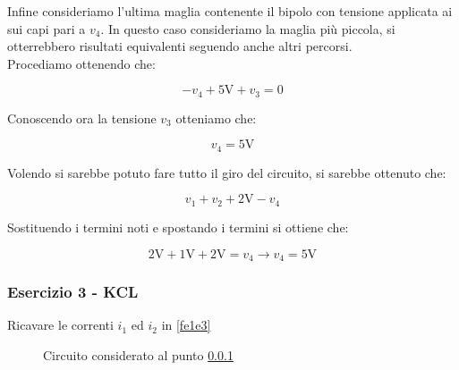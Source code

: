 \documentclass[../main.tex]{subfiles}
\begin{document}
Infine consideriamo l'ultima maglia contenente il bipolo con tensione applicata ai sui capi pari a $v_4$. In questo caso consideriamo la maglia più piccola, si otterrebbero risultati equivalenti seguendo anche altri percorsi.\\

Procediamo ottenendo che:

\begin{equation}
	-v_4 + \text{5V} + v_3 = 0
\end{equation}

Conoscendo ora la tensione $v_3$ otteniamo che:

\begin{equation}
	v_4 = \text{5V}
\end{equation}

Volendo si sarebbe potuto fare tutto il giro del circuito, si sarebbe ottenuto che:

\begin{equation}
	v_1 + v_2 + \text{2V} -v_4
\end{equation}

Sostituendo i termini noti e spostando i termini si ottiene che:

\begin{equation}
	\text{2V} + \text{1V} + \text{2V} = v_4 \longrightarrow v_4 = \text{5V}
\end{equation}

\vspace*{1.5cm}
\subsubsection{Esercizio 3 - KCL}
\label{e1e3}

Ricavare le correnti $i_1$ ed $i_2$ in \ref{fe1e3}

\begin{figure}[h!]
\begin{center}

	
\end{center}	
\caption{Circuito considerato al punto \ref{e1e3}}
\end{figure}
\label{fe1e3}
\end{document}
